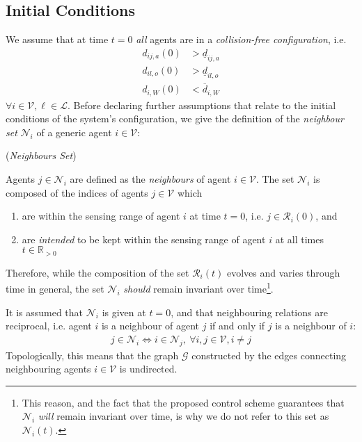 \subsection{Initial Conditions}

We assume that at time $t=0$ \textit{all} agents are in a
\textit{collision-free configuration}, i.e.
\begin{subequations}
\begin{align}
    d_{ij,a}(0) &> \underline{d}_{ij,a} \\
    d_{il,o}(0) &> \underline{d}_{il,o} \\
    d_{i,W}(0)  &< \overline{d}_{i,W}
\label{eq:initially_coll_free}
\end{align}
\end{subequations}
$\forall i \in \mathcal{V}, \ell \in \mathcal{L}$. Before declaring further
assumptions that relate to the initial conditions of the system's configuration,
we give the definition of the \textit{neighbour set} $\mathcal{N}_i$ of a
generic agent $i \in \mathcal{V}$:
\begin{bw_box}
\begin{definition} (\textit{Neighbours Set})

Agents $j \in \mathcal{N}_i$ are defined as the \textit{neighbours} of
agent $i \in \mathcal{V}$. The set $\mathcal{N}_i$ is composed of the
indices of agents $j \in \mathcal{V}$ which
\begin{enumerate}
  \item are within the sensing range of agent $i$ at time $t=0$, i.e.
    $j \in \mathcal{R}_i(0)$, and
  \item are \textit{intended} to be kept within the sensing range of agent $i$ at all
    times $t \in \mathbb{R}_{> 0}$
\end{enumerate}
\end{definition}
\end{bw_box}

Therefore, while the composition of the set $\mathcal{R}_i(t)$ evolves and
varies through time in general, the set $\mathcal{N}_i$ \textit{should} remain
invariant over time\footnote{This reason, and the fact that the proposed
control scheme guarantees that $\mathcal{N}_i$ \textit{will} remain invariant
over time, is why we do not refer to this set as $\mathcal{N}_i(t)$.}.

It is assumed that $\mathcal{N}_i$ is given at $t=0$, and that neighbouring
relations are reciprocal, i.e. agent $i$ is a neighbour of agent $j$ if and
only if $j$ is a neighbour of $i$:
\begin{subequations}
\begin{align}
  j \in \mathcal{N}_i \Leftrightarrow i \in \mathcal{N}_j,\ \forall i,j \in \mathcal{V}, i\not=j
\end{align}
\end{subequations}
Topologically, this means that the graph $\mathcal{G}$ constructed by the edges
connecting neighbouring agents $i \in \mathcal{V}$ is undirected.

